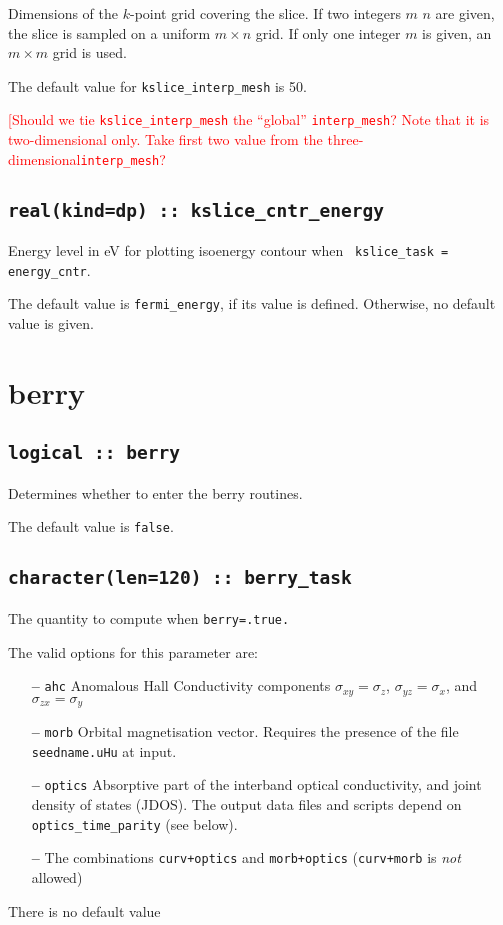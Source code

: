 Dimensions of the $k$-point grid covering the slice.
If two integers $m$ $n$ are given, the slice is sampled on a uniform
$m\times n$ grid.  If only one integer $m$ is given, an $m\times m$
grid is used.

The default value for \verb#kslice_interp_mesh# is 50.

\textcolor{red}{{[Should we tie {\tt kslice\_interp\_mesh} the ``global''
{\tt interp\_mesh}? Note that it is two-dimensional only. Take first
two value from the three-dimensional{\tt interp\_mesh}?}}


\subsection[kslice\_cntr\_energy]{\tt real(kind=dp) :: kslice\_cntr\_energy}

Energy level in eV for plotting isoenergy contour when {\tt
  kslice\_task = energy\_cntr}.

The default value is {\tt fermi\_energy}, if its value is
defined. Otherwise, no default value is given.

\clearpage
\section{berry}

\subsection[berry]{\tt logical :: berry}
Determines whether to enter the berry routines.

The default value is \verb#false#.


\subsection[berry\_task]{\tt character(len=120) ::  berry\_task}
The quantity to compute when {\tt berry=.true.}

The valid options for this parameter are:
\begin{itemize}
\item[{\bf --}] \verb#ahc# Anomalous Hall Conductivity components
  $\sigma_{xy}=\sigma_z$, $\sigma_{yz}=\sigma_x$, and
  $\sigma_{zx}=\sigma_y$
\item[{\bf --}]  \verb#morb# Orbital magnetisation vector. Requires the
presence of the file {\tt seedname.uHu} at input.

\item[{\bf --}] \verb#optics# Absorptive part of the interband optical
  conductivity, and joint density of states (JDOS).  The output data
  files and scripts depend on {\tt optics\_time\_parity} (see below).

\item[{\bf --}] The combinations {\tt curv+optics} and {\tt morb+optics}
({\tt curv+morb} is {\it not} allowed)

\end{itemize}
There is no default value


